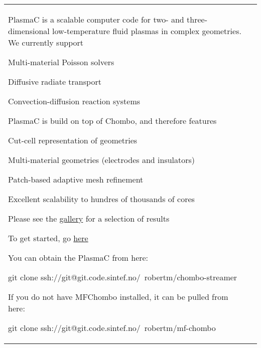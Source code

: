 \tabulinesep=1mm
\begin{longtabu} spread 0pt [c]{*2{|X[-1]}|}
\hline
PlasmaC is a scalable computer code for two-\/ and three-\/dimensional low-\/temperature fluid plasmas in complex geometries. We currently support


\begin{DoxyItemize}
\item Multi-\/material Poisson solvers
\item Diffusive radiate transport
\item Convection-\/diffusion reaction systems
\end{DoxyItemize}

PlasmaC is build on top of Chombo, and therefore features


\begin{DoxyItemize}
\item Cut-\/cell representation of geometries
\item Multi-\/material geometries (electrodes and insulators)
\item Patch-\/based adaptive mesh refinement
\item Excellent scalability to hundres of thousands of cores
\end{DoxyItemize}

Please see the \hyperlink{gallery}{gallery} for a selection of results

To get started, go \hyperlink{doxy-contents}{here}

You can obtain the PlasmaC from here\+: \begin{DoxyVerb}  git clone ssh://git@git.code.sintef.no/~robertm/chombo-streamer
\end{DoxyVerb}


If you do not have M\+F\+Chombo installed, it can be pulled from here\+: \begin{DoxyVerb}  git clone ssh://git@git.code.sintef.no/~robertm/mf-chombo
\end{DoxyVerb}
  &   \\
\end{longtabu}
